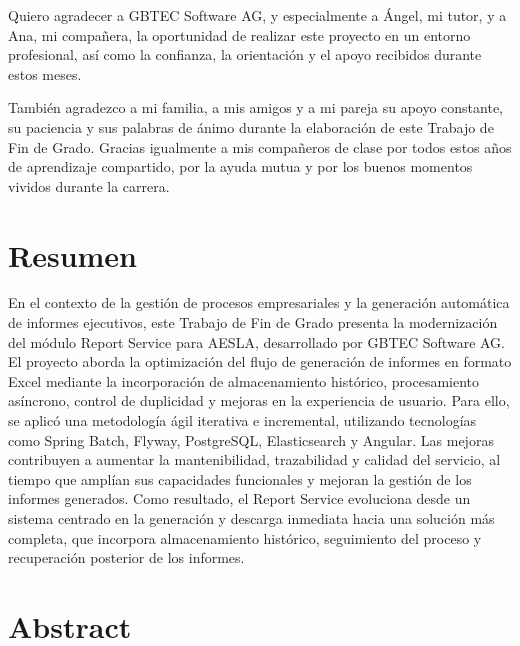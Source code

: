 \documentclass[11pt,a4paper,titlepage,oneside]{report}
\begin{document}

 
 \paxinaenbranco
 \begin{agradecementos}
 Quiero agradecer a GBTEC Software AG, y especialmente a Ángel, mi tutor, y a
 Ana, mi compañera, la oportunidad de realizar este proyecto en un entorno
 profesional, así como la confianza, la orientación y el apoyo recibidos
 durante estos meses.

 También agradezco a mi familia, a mis amigos y a mi pareja su apoyo constante,
 su paciencia y sus palabras de ánimo durante la elaboración de este Trabajo de
 Fin de Grado. Gracias igualmente a mis compañeros de clase por todos estos
 años de aprendizaje compartido, por la ayuda mutua y por los buenos momentos
 vividos durante la carrera.
 \end{agradecementos}

\section*{Resumen}
\justifying

En el contexto de la gestión de procesos empresariales y la generación
automática de informes ejecutivos, este Trabajo de Fin de Grado presenta la
modernización del módulo Report Service para AESLA, desarrollado por GBTEC
Software AG. El proyecto aborda la optimización del flujo de generación de
informes en formato Excel mediante la incorporación de almacenamiento
histórico, procesamiento asíncrono, control de duplicidad y mejoras en la
experiencia de usuario. Para ello, se aplicó una metodología ágil iterativa e
incremental, utilizando tecnologías como Spring Batch, Flyway, PostgreSQL,
Elasticsearch y Angular. Las mejoras contribuyen a aumentar la mantenibilidad,
trazabilidad y calidad del servicio, al tiempo que amplían sus capacidades
funcionales y mejoran la gestión de los informes generados. Como resultado, el
Report Service evoluciona desde un sistema centrado en la generación y descarga
inmediata hacia una solución más completa, que incorpora almacenamiento
histórico, seguimiento del proceso y recuperación posterior de los informes.

\vspace{1cm}

\section*{Abstract}
\justifying
\end{document}

